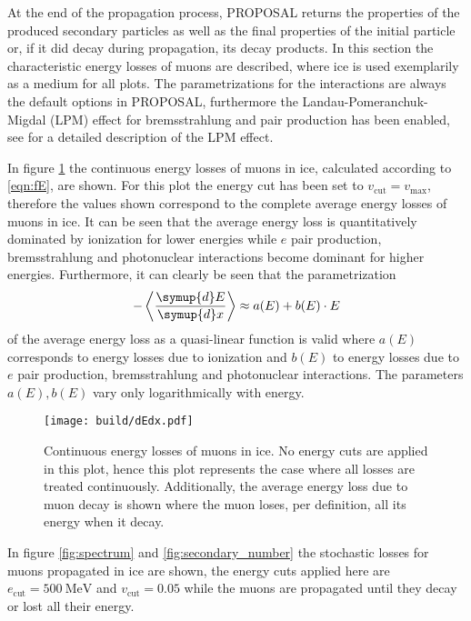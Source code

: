 At the end of the propagation process, PROPOSAL returns the properties of the produced secondary particles as well as the final properties of the initial particle or, if it did decay during propagation, its decay products.
In this section the characteristic energy losses of muons are described, where ice is used exemplarily as a medium for all plots. The parametrizations for the interactions are always the default options in PROPOSAL, furthermore the Landau-Pomeranchuk-Migdal (LPM) effect for bremsstrahlung and pair production has been enabled, see \cite{Kohne:2013zbq} for a detailed description of the LPM effect.

In figure \ref{fig:dEdx} the continuous energy losses of muons in ice, calculated according to \eqref{eqn:fE}, are shown.
For this plot the energy cut has been set to $v_\text{cut} = v_\text{max}$, therefore the values shown correspond to the complete average energy losses of muons in ice. 
It can be seen that the average energy loss is quantitatively dominated by ionization for lower energies while $e$ pair production, bremsstrahlung and photonuclear interactions become dominant for higher energies.
Furthermore, it can clearly be seen that the parametrization
%
\begin{equation}
	- \left\langle \frac{\symup{d}E}{\symup{d}x} \right\rangle \approx a(E) + b(E) \cdot E
\end{equation}
%
of the average energy loss as a quasi-linear function is valid where $a(E)$ corresponds to energy losses due to ionization and $b(E)$ to energy losses due to $e$ pair production, bremsstrahlung and photonuclear interactions.
The parameters $a(E), b(E)$ vary only logarithmically with energy.

\begin{figure}
    \centering
    \texttt{[image: build/dEdx.pdf]}
    \caption{Continuous energy losses of muons in ice. No energy cuts are applied in this plot, hence this plot represents the case where all losses are treated continuously. Additionally, the average energy loss due to muon decay is shown where the muon loses, per definition, all its energy when it decay. }
    \label{fig:dEdx}
\end{figure}

In figure \ref{fig:spectrum} and \ref{fig:secondary_number} the stochastic losses for muons propagated in ice are shown, the energy cuts applied here are $e_\text{cut} = \SI{500}{\mega\electronvolt}$ and $v_\text{cut} = \num{0.05}$ while the muons are propagated until they decay or lost all their energy.

